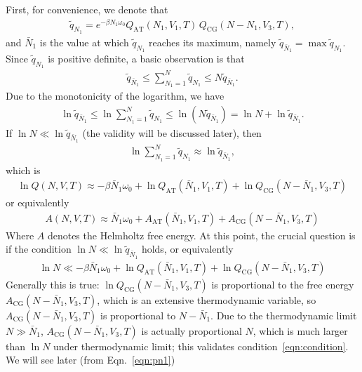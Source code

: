 \documentclass[aip,jcp,a4paper,reprint,onecolumn]{revtex4-1}
\newcommand{\AT}{{\textrm{{AT}}}}
\newcommand{\CG}{{\textrm{CG}}}
\begin{document}
First, for convenience, we denote that
\begin{align}
  \tilde q_{N_1} = 
  e^{-\beta N_1\omega_0}
  Q_{\AT}(N_1, V_1, T)\,
  Q_{\CG}(N - N_1, V_3, T),
\end{align}
and $\bar N_1$ is the value at which $\tilde q_{N_1}$ reaches
its maximum, namely $\tilde q_{\bar N_1} = \max \tilde q_{N_1}$.
Since $\tilde q_{N_1}$ is positive definite, a basic
observation is that
\begin{align}
  \tilde q_{\bar N_1}
  \leq
  \sum_{N_1=1}^N \tilde q_{N_1}
  \leq
  N \tilde q_{\bar N_1}. 
\end{align}
Due to the monotonicity of the logarithm, we have
\begin{align}
  \ln\tilde q_{\bar N_1}
  \leq
  \ln\sum_{N_1=1}^N \tilde q_{N_1}
  \leq
  \ln (N \tilde q_{\bar N_1})
  =
  \ln N + \ln\tilde q_{\bar N_1}.
\end{align}
If $\ln N \ll \ln \tilde q_{\bar N_1}$ (the validity will be discussed
later), then 
\begin{align}
  \ln\sum_{N_1=1}^N \tilde q_{N_1}
  \approx
  \ln\tilde q_{\bar N_1},
\end{align}
which is
\begin{align}
  \ln Q(N, V, T)
  \approx
  -\beta \bar N_1\omega_0 + 
  \ln Q_{\AT}(\bar N_1, V_1, T) + \ln Q_{\CG}(N - \bar N_1, V_3, T)
\end{align}
or equivalently
\begin{align}\label{eqn:a-energy-1}
  A(N, V, T)
  \approx
  \bar N_1\omega_0 +
  A_{\AT}(\bar N_1, V_1, T) + A_{\CG}(N - \bar N_1, V_3, T)
\end{align}
Where $A$ denotes the Helmholtz free energy. 
At this point, the crucial question is if the condition $\ln N \ll \ln \tilde q_{\bar N_1}$
holds, or equivalently
\begin{align}\label{eqn:condition}
  \ln N 
  \ll
  -\beta \bar N_1\omega_0 +
  \ln Q_{\AT}(\bar N_1, V_1, T) + \ln Q_{\CG}(N - \bar N_1, V_3, T)
\end{align}
Generally this is true: $\ln Q_{\CG}(N - \bar N_1, V_3, T)$
is proportional to the free energy $A_{\CG}(N - \bar N_1, V_3, T)$,
which is an extensive thermodynamic variable, so
$A_{\CG}(N - \bar N_1, V_3, T)$ is proportional to $N-\bar N_1$.
Due to the thermodynamic limit $N \gg \bar N_1$,
$A_{\CG}(N - \bar N_1, V_3, T)$ is actually proportional $N$, which
is much larger than $\ln N$ under thermodynamic limit; this
validates condition~\eqref{eqn:condition}.
We will see later (from Eqn.~\eqref{eqn:pn1})
\end{document}
